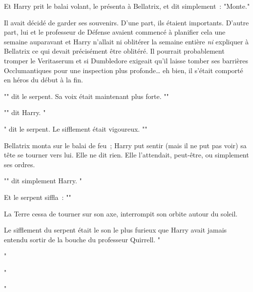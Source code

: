 Et Harry prit le balai volant, le présenta à Bellatrix, et dit simplement~: "Monte."

Il avait décidé de garder ses souvenirs. D'une part, ils étaient importants. D'autre part, lui et le professeur de Défense avaient commencé à planifier cela une semaine auparavant et Harry n'allait ni oblitérer la semaine entière \emph{ni} expliquer à Bellatrix ce qui devait précisément être oblitéré. Il pourrait probablement tromper le Veritaserum et si Dumbledore exigeait qu'il laisse tomber ses barrières Occlumantiques pour une inspection plus profonde… eh bien, il s'était comporté en héros du début à la fin.

"" dit le serpent. Sa voix était maintenant plus forte. ""

"" dit Harry. "

" dit le serpent. Le sifflement était vigoureux. ""

Bellatrix monta sur le balai de feu~; Harry put sentir (mais il ne put pas voir) sa tête se tourner vers lui. Elle ne dit rien. Elle l'attendait, peut-être, ou simplement ses ordres.

"" dit simplement Harry. "

Et le serpent siffla~: ""

La Terre cessa de tourner sur son axe, interrompit son orbite autour du soleil.

Le sifflement du serpent était le son le plus furieux que Harry avait jamais entendu sortir de la bouche du professeur Quirrell. "

"

"

"

